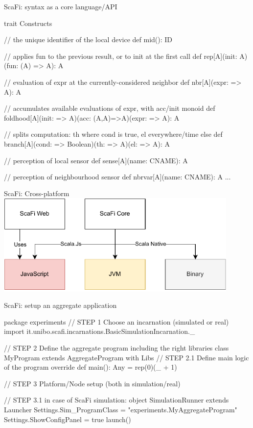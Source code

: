 \documentclass[presentation, 9pt]{beamer}\mode<presentation>{\usetheme{AMSBolognaFC}}
\begin{document}
\begin{frame}[fragile]{ScaFi: syntax as a core language/API}

	\begin{mycode}{}{}{}
trait Constructs {
	// the unique identifier of the local device 
	def mid(): ID
	
	// applies fun to the previous result, or to init at the first call
	def rep[A](init: A)(fun: (A) => A): A
	
	// evaluation of expr at the currently-considered neighbor
	def nbr[A](expr: => A): A
	
	// accumulates available evaluations of expr, with acc/init monoid
	def foldhood[A](init: => A)(acc: (A,A)=>A)(expr: => A): A
	
	// splits computation: th where cond is true, el everywhere/time else
	def branch[A](cond: => Boolean)(th: => A)(el: => A): A
	
	// perception of local sensor
	def sense[A](name: CNAME): A
	
	// perception of neighbourhood sensor
	def nbrvar[A](name: CNAME): A
	...
}
\end{mycode}
\end{frame}
\begin{frame}{ScaFi: Cross-platform}
	\centering
	\includegraphics[width=0.9\textwidth]{img/multi-platform.drawio}
\end{frame}
\begin{frame}[fragile]{ScaFi: setup an aggregate application}
\begin{mycode}{}{}{}
package experiments
// STEP 1 Choose an incarnation (simulated or real)
import it.unibo.scafi.incarnations.BasicSimulationIncarnation._

// STEP 2 Define the aggregate program including the right libraries
class MyProgram extends AggregateProgram with Libs {
	// STEP 2.1 Define main logic of the program
	override def main(): Any = rep(0)(_ + 1)
}

// STEP 3 Platform/Node setup (both in simulation/real)

// STEP 3.1 in case of ScaFi simulation:
object SimulationRunner extends Launcher {
  Settings.Sim_ProgramClass = "experiments.MyAggregateProgram"
  Settings.ShowConfigPanel = true
  launch()
}
\end{mycode}
\end{frame}
\end{document}
